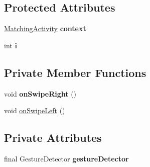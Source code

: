 \subsection*{Protected Attributes}
\begin{DoxyCompactItemize}
\item 
\hyperlink{classcom_1_1example_1_1sebastian_1_1tindertp_1_1MatchingActivity}{Matching\+Activity} {\bfseries context}\hypertarget{classcom_1_1example_1_1sebastian_1_1tindertp_1_1gestureTools_1_1OnSwipeTapTouchListener_acbd163e244544835023513f086e856a6}{}\label{classcom_1_1example_1_1sebastian_1_1tindertp_1_1gestureTools_1_1OnSwipeTapTouchListener_acbd163e244544835023513f086e856a6}

\item 
int {\bfseries i}\hypertarget{classcom_1_1example_1_1sebastian_1_1tindertp_1_1gestureTools_1_1OnSwipeTapTouchListener_aee2539d969381b01946c3e3d84c3ef8f}{}\label{classcom_1_1example_1_1sebastian_1_1tindertp_1_1gestureTools_1_1OnSwipeTapTouchListener_aee2539d969381b01946c3e3d84c3ef8f}

\end{DoxyCompactItemize}
\subsection*{Private Member Functions}
\begin{DoxyCompactItemize}
\item 
void {\bfseries on\+Swipe\+Right} ()\hypertarget{classcom_1_1example_1_1sebastian_1_1tindertp_1_1gestureTools_1_1OnSwipeTapTouchListener_a4ab83b17fc4347bd23b81ca496d4e725}{}\label{classcom_1_1example_1_1sebastian_1_1tindertp_1_1gestureTools_1_1OnSwipeTapTouchListener_a4ab83b17fc4347bd23b81ca496d4e725}

\item 
void \hyperlink{classcom_1_1example_1_1sebastian_1_1tindertp_1_1gestureTools_1_1OnSwipeTapTouchListener_a487ee3d75143c4e124a33e089d9adaa8}{on\+Swipe\+Left} ()
\end{DoxyCompactItemize}
\subsection*{Private Attributes}
\begin{DoxyCompactItemize}
\item 
final Gesture\+Detector {\bfseries gesture\+Detector}\hypertarget{classcom_1_1example_1_1sebastian_1_1tindertp_1_1gestureTools_1_1OnSwipeTapTouchListener_ad877957fb346e74cc5c276318218452c}{}\label{classcom_1_1example_1_1sebastian_1_1tindertp_1_1gestureTools_1_1OnSwipeTapTouchListener_ad877957fb346e74cc5c276318218452c}

\end{DoxyCompactItemize}


